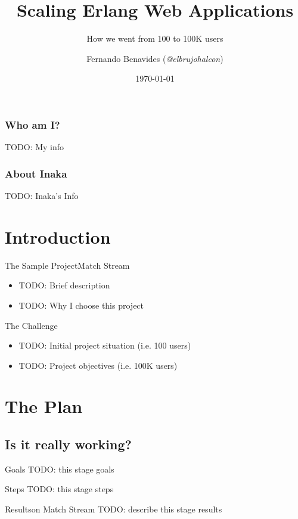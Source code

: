 \documentclass[utf8]{beamer}
\begin{document}
\title{Scaling Erlang Web Applications}
\subtitle{How we went from 100 to 100K users}
\author{Fernando Benavides (\textit{@elbrujohalcon})}
\date{\today}

\frame{\titlepage} 

\begin{frame}
	\frametitle{Who am I?}
	TODO: My info
\end{frame}

\begin{frame}
	\frametitle{About Inaka}
	TODO: Inaka's Info
\end{frame}


\section{Introduction}
\begin{frame}{The Sample Project}{Match Stream}
	\begin{itemize}
		\item TODO: Brief description
		\item TODO: Why I choose \alert{this} project
	\end{itemize}
\end{frame}
\begin{frame}{The Challenge}
	\begin{itemize}
		\item TODO: Initial project situation (i.e. 100 users)
		\item TODO: Project objectives (i.e. 100K users)
	\end{itemize}
\end{frame}

\section{The Plan}
\subsection{Is it really working?}
\begin{frame}{Goals}
	TODO: this stage goals
\end{frame}
\begin{frame}{Steps}
	TODO: this stage steps
\end{frame}
\begin{frame}{Results}{on Match Stream}
	TODO: describe this stage results
\end{frame}
\end{document}
